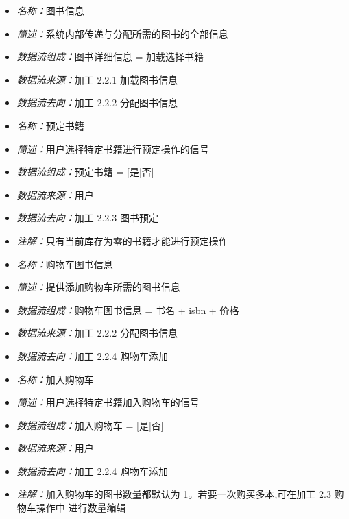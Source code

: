 \documentclass{article}
\begin{document}
\begin{CJK*}{UTF8}{gbsn}
\vspace{-1mm}

\begin{itemize}
	\item \textit{名称：}图书信息
	\item \textit{简述：}系统内部传递与分配所需的图书的全部信息
	\item \textit{数据流组成：}图书详细信息 = 加载选择书籍
	\item \textit{数据流来源：}加工 2.2.1 加载图书信息
	\item \textit{数据流去向：}加工 2.2.2 分配图书信息
\end{itemize}

\vspace{-1mm}

\begin{itemize}
	\item \textit{名称：}预定书籍
	\item \textit{简述：}用户选择特定书籍进行预定操作的信号
	\item \textit{数据流组成：}预定书籍 = [是|否]
	\item \textit{数据流来源：}用户
	\item \textit{数据流去向：}加工 2.2.3 图书预定
	\item \textit{注解：}只有当前库存为零的书籍才能进行预定操作
\end{itemize}

\vspace{-1mm}

\begin{itemize}
	\item \textit{名称：}购物车图书信息
	\item \textit{简述：}提供添加购物车所需的图书信息
	\item \textit{数据流组成：}购物车图书信息  = 书名 + isbn + 价格
	\item \textit{数据流来源：}加工 2.2.2 分配图书信息
	\item \textit{数据流去向：}加工 2.2.4 购物车添加
\end{itemize}

\vspace{-1mm}

\begin{itemize}
	\item \textit{名称：}加入购物车
	\item \textit{简述：}用户选择特定书籍加入购物车的信号
	\item \textit{数据流组成：}加入购物车 = [是|否]
	\item \textit{数据流来源：}用户
	\item \textit{数据流去向：}加工 2.2.4 购物车添加
	\item \textit{注解：}加入购物车的图书数量都默认为 1。若要一次购买多本,可在加工 2.3 购物车操作中	进行数量编辑
\end{itemize}


\end{CJK*}
\end{document}
